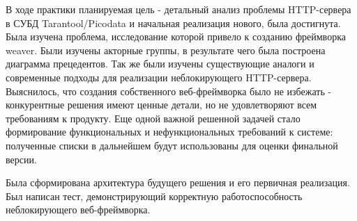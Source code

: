 \documentclass[times,numbers=noenddot]{itmo-student-thesis}
\begin{document}
\startconclusionpage

В ходе практики планируемая цель - детальный анализ проблемы HTTP-сервера в СУБД Tarantool/Picodata и начальная реализация нового, была достигнута.
Была изучена проблема, исследование которой привело к созданию фреймворка weaver.
Были изучены акторные группы, в результате чего была построена диаграмма прецедентов.
Так же были изучены существующие аналоги и современные подходы для реализации неблокирующего HTTP-сервера.
Выяснилось, что создания собственного веб-фреймворка было не избежать - конкурентные решения имеют ценные детали, но не удовлетворяют всем требованиям к продукту.
Еще одной важной решенной задачей стало формирование функциональных и нефункциональных требований к системе: полученные списки в дальнейшем будут использованы для оценки финальной версии.

Была сформирована архитектура будущего решения и его первичная реализация. Был написан тест, демонстрирующий корректную работоспособность неблокирующего веб-фреймворка.

\startsourcespage
\end{document}
